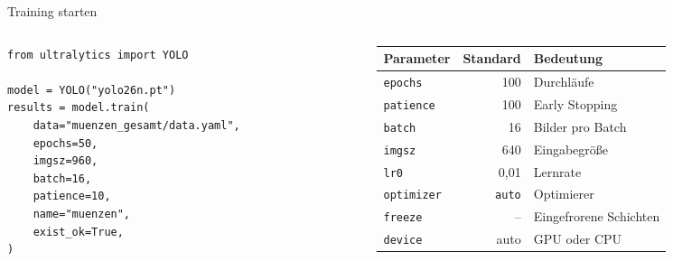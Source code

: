 \begin{frame}[fragile]{Training starten}
\footnotesize
\begin{columns}
\begin{column}{0.47\textwidth}
{\footnotesize
\begin{verbatim}
from ultralytics import YOLO

model = YOLO("yolo26n.pt")
results = model.train(
    data="muenzen_gesamt/data.yaml",
    epochs=50,
    imgsz=960,
    batch=16,
    patience=10,
    name="muenzen",
    exist_ok=True,
)
\end{verbatim}
}
\end{column}
\begin{column}{0.48\textwidth}
\centering
\begin{tabular}{lrl}
\toprule
\textbf{Parameter} & \textbf{Standard} & \textbf{Bedeutung} \\
\midrule
\texttt{epochs} & 100 & Durchläufe \\
\texttt{patience} & 100 & Early Stopping \\
\texttt{batch} & 16 & Bilder pro Batch \\
\texttt{imgsz} & 640 & Eingabegröße \\
\texttt{lr0} & 0,01 & Lernrate \\
\texttt{optimizer} & \texttt{auto} & Optimierer \\
\texttt{freeze} & -- & Eingefrorene Schichten \\
\texttt{device} & auto & GPU oder CPU \\
\bottomrule
\end{tabular}
\end{column}
\end{columns}
\end{frame}

